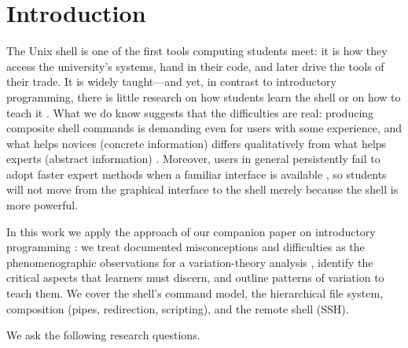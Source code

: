 \mode*
\section{Introduction}

The Unix shell is one of the first tools computing students meet: it is how
they access the university's systems, hand in their code, and later drive
the tools of their trade.
It is widely taught---and yet, in contrast to introductory programming,
there is little research on how students learn the shell or on how to teach
it \autocite{Winder2024ShellTutor}.
What we do know suggests that the difficulties are real: producing composite
shell commands is demanding even for users with some experience, and what
helps novices (concrete information) differs qualitatively from what helps
experts (abstract information) \autocite{Doane1992UnixPrompts}.
Moreover, users in general persistently fail to adopt faster expert methods
when a familiar interface is available \autocite{Cockburn2014NoviceExpert},
so students will not move from the graphical interface to the shell merely
because the shell is more powerful.


In this work we apply the approach of our companion paper on introductory
programming \autocite{VTProgMisconceptions}: we treat documented
misconceptions and difficulties as the phenomenographic observations for a
variation-theory analysis \autocite{NCOL}, identify the critical aspects
that learners must discern, and outline patterns of variation to teach them.
We cover the shell's command model, the hierarchical file system,
composition (pipes, redirection, scripting), and the remote shell (SSH).

We ask the following research questions.

